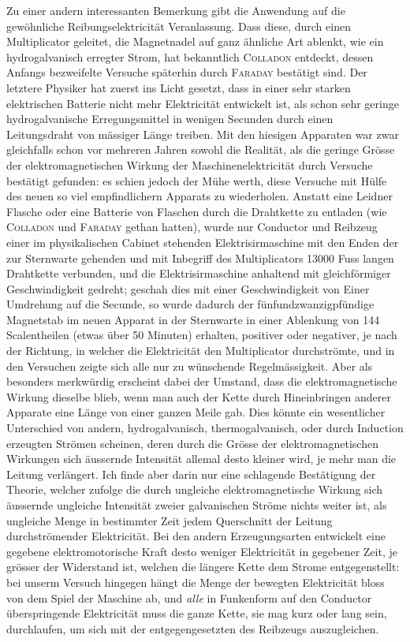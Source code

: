 Zu einer andern interessanten Bemerkung gibt die Anwendung auf die gewöhnliche Reibungselektricität Veranlassung. Dass diese, durch einen Multiplicator geleitet, die Magnetnadel auf ganz ähnliche Art ablenkt, wie ein hydrogalvanisch erregter Strom, hat bekanntlich \textsc{Colladon} entdeckt, dessen Anfangs bezweifelte Versuche späterhin durch \textsc{Faraday} bestätigt sind. Der letztere Physiker hat zuerst ins Licht gesetzt, dass in einer sehr starken elektrischen Batterie nicht mehr Elektricität entwickelt ist, als schon sehr geringe hydrogalvanische Erregungsmittel in wenigen Secunden durch einen Leitungsdraht von mässiger Länge treiben. Mit den hiesigen Apparaten war zwar gleichfalls schon vor mehreren Jahren sowohl die Realität, als die geringe Grösse der elektromagnetischen Wirkung der Maschinenelektricität durch Versuche bestätigt gefunden: es schien jedoch der Mühe werth, diese Versuche mit Hülfe des neuen so viel empfindlichern Apparats zu wiederholen. Anstatt eine Leidner Flasche oder eine Batterie von Flaschen durch die Drahtkette zu entladen (wie \textsc{Colladon} und \textsc{Faraday} gethan hatten), wurde nur Conductor und Reibzeug einer im physikalischen Cabinet stehenden Elektrisirmaschine mit den Enden der zur Sternwarte gehenden und mit Inbegriff des Multiplicators 13000 Fuss langen Drahtkette verbunden, und die Elektrisirmaschine anhaltend mit gleichförmiger Geschwindigkeit gedreht; geschah dies mit einer Geschwindigkeit von Einer Umdrehung auf die Secunde, so wurde dadurch der fünfundzwanzigpfündige Magnetstab im neuen Apparat in der Sternwarte in einer Ablenkung von 144 Scalentheilen (etwas über 50 Minuten) erhalten, positiver oder negativer, je nach der Richtung, in welcher die Elektricität den Multiplicator durchströmte, und in den Versuchen zeigte sich alle nur zu wünschende Regelmässigkeit. Aber als besonders merkwürdig erscheint dabei der Umstand, dass die elektromagnetische Wirkung dieselbe blieb, wenn man auch der Kette durch Hineinbringen anderer Apparate eine Länge von einer ganzen Meile gab. Dies könnte ein wesentlicher Unterschied von andern, hydrogalvanisch, thermogalvanisch, oder durch Induction erzeugten Strömen scheinen, deren durch die Grösse der elektromagnetischen Wirkungen sich äussernde Intensität allemal desto kleiner wird, je mehr man die Leitung verlängert. Ich finde aber darin nur eine schlagende Bestätigung der Theorie, welcher zufolge die durch ungleiche elektromagnetische Wirkung sich äussernde ungleiche Intensität zweier galvanischen Ströme nichts weiter ist, als ungleiche Menge in bestimmter Zeit jedem Querschnitt der Leitung durchströmender Elektricität.
Bei den andern Erzeugungsarten entwickelt eine gegebene elektromotorische Kraft desto weniger Elektricität in gegebener Zeit, je grösser der Widerstand ist, welchen die längere Kette dem Strome entgegenstellt: bei unserm Versuch hingegen hängt die Menge der bewegten Elektricität bloss von dem Spiel der Maschine ab, und \textit{alle} in Funkenform auf den Conductor überspringende Elektricität muss die ganze Kette, sie mag kurz oder lang sein, durchlaufen, um sich mit der entgegengesetzten des Reibzeugs auszugleichen.

